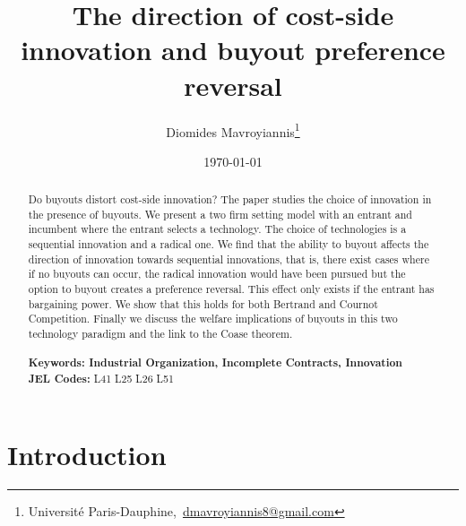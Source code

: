 \documentclass[11pt]{article}
\begin{document}
\begin{titlepage}
\title{The direction of cost-side innovation and buyout preference reversal}
\author{Diomides Mavroyiannis\footnote{Universit\'{e} Paris-Dauphine,~\url{dmavroyiannis8@gmail.com}} }
\date{\today}
\maketitle



\begin{abstract}
\noindent Do buyouts distort cost-side innovation?
The paper studies the choice of innovation in the presence of buyouts. We present a two firm setting model with an entrant and incumbent where the entrant selects a technology. The choice of technologies is a sequential innovation and a radical one. We find that the ability to buyout affects the direction of innovation towards sequential innovations, that is, there exist cases where if no buyouts can occur, the radical innovation would have been pursued but the option to buyout creates a preference reversal. This effect only exists if the entrant has bargaining power. We show that this holds for both Bertrand and Cournot Competition. Finally we discuss the welfare implications of buyouts in this two technology paradigm and the link to the Coase theorem. 
\\
\\
\noindent\textbf{Keywords: Industrial Organization, Incomplete Contracts, Innovation}
\\
\noindent\textbf{JEL Codes:} L41 L25 L26 L51 \\

\bigskip
\end{abstract}
\setcounter{page}{0}
\thispagestyle{empty}
\end{titlepage}
\pagebreak \newpage

	

\newpage
\section{Introduction}
\end{document}
